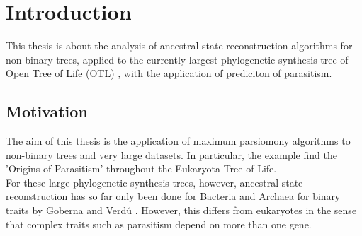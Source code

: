 \tableofcontents
\clearpage
{}

\chapter{Introduction}
  This thesis is about the analysis of ancestral state reconstruction algorithms for non-binary 
    trees, applied to the currently largest phylogenetic synthesis tree of Open Tree of Life (OTL)
    \cite{Hinchliff2015}, with the application of prediciton of parasitism. \\
  
  \section{Motivation}
    The aim of this thesis is the application of maximum parsiomony algorithms to non-binary 
      trees and very large datasets. In particular, the example find the 'Origins of Parasitism' 
      throughout the Eukaryota Tree of Life. \\
    For these large phylogenetic synthesis trees, however, ancestral state reconstruction has so far 
      only been done for Bacteria and Archaea for binary traits by Goberna and Verdú \cite{Goberna2015}.
      However, this differs from eukaryotes in the sense that complex traits such as parasitism depend
      on more than one gene. \\

